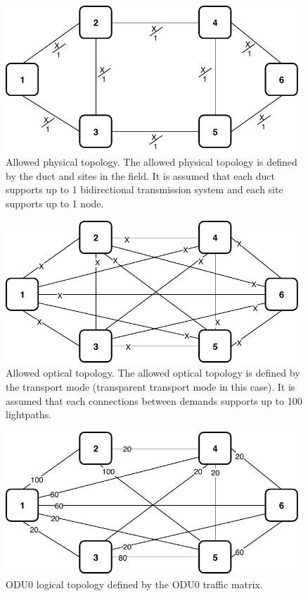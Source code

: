 \begin{figure}[h!]
\centering
\includegraphics[width=11cm]{sdf/ilp/transparent_protection/figures/allowed_physical_topology}
\caption{Allowed physical topology. The allowed physical topology is defined by the duct and sites in the field. It is assumed that each duct supports up to 1 bidirectional transmission system and each site supports up to 1 node.}
\label{allowed2_physical_protectionhigh}
\end{figure}

\newpage
\begin{figure}[h!]
\centering
\includegraphics[width=11cm]{sdf/ilp/transparent_protection/figures/allowed_optical_topology}
\caption{Allowed optical topology. The allowed optical topology is defined by the transport mode (transparent transport mode in this case). It is assumed that each connections between demands supports up to 100 lightpaths.}
\label{allowed2_optical_protectionhigh}
\end{figure}

\begin{figure}[h!]
\centering
\includegraphics[width=11cm]{sdf/ilp/transparent_protection/figures/logical_topology_ODU0_high}
\caption{ODU0 logical topology defined by the ODU0 traffic matrix.}
\label{logical2_ODU0_protectionhigh}
\end{figure}

